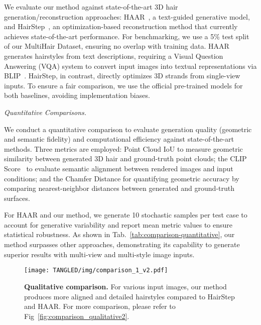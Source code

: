 We evaluate our method against state-of-the-art 3D hair generation/reconstruction approaches: HAAR~\cite{HAAR:CVPR:2024}, a text-guided generative model, and HairStep~\cite{zheng2023hairstep}, an optimization-based reconstruction method that currently achieves state-of-the-art performance. For benchmarking, we use a 5\% test split of our MultiHair Dataset, ensuring no overlap with training data.
%
HAAR generates hairstyles from text descriptions, requiring a Visual Question Answering (VQA) system to convert input images into textual representations via BLIP~\cite{li2022blip}. HairStep, in contrast, directly optimizes 3D strands from single-view inputs. To ensure a fair comparison, we use the official pre-trained models for both baselines, avoiding implementation biases.


\vspace{4pt}
\noindent \textit{Quantitative Comparisons.}

We conduct a quantitative comparison to evaluate generation quality (geometric and semantic fidelity) and computational efficiency against state-of-the-art methods. Three metrics are employed: Point Cloud IoU to measure geometric similarity between generated 3D hair and ground-truth point clouds; the CLIP Score~\cite{radford2021learning} to evaluate semantic alignment between rendered images and input conditions; and the Chamfer Distance for quantifying geometric accuracy by comparing nearest-neighbor distances between generated and ground-truth surfaces.

For HAAR and our method, we generate 10 stochastic samples per test case to account for generative variability and report mean metric values to ensure statistical robustness. As shown in Tab.~\ref{tab:comparison-quantitative}, our method surpasses other approaches, demonstrating its capability to generate superior results with multi-view and multi-style image inputs. 


\begin{figure}[tbp]
  \texttt{[image: TANGLED/img/comparison\_1\_v2.pdf]}
  \caption{\textbf{Qualitative comparison.} For various input images, our method produces more aligned and detailed hairstyles compared to HairStep and HAAR. For more comparison, please refer to Fig~\ref{fig:comparison_qualitative2}.}
  \label{fig:comparison_qualitative}
\end{figure}

